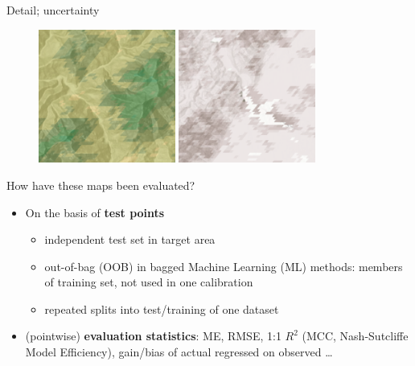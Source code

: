 \documentclass[aspectratio=169]{beamer}
\begin{document}
\begin{frame}{Detail; uncertainty}
\begin{figure}
\includegraphics[width=0.4\textwidth]{./graphics_david/SoilGridsDetail.png}
\hfill
\includegraphics[width=0.4\textwidth]{./graphics_david/SoilGridsUncertainty.png}
\end{figure}
\end{frame}

\begin{frame}{How have these maps been evaluated?}
    \begin{itemize}
        \item On the basis of \textbf{test points}
        \begin{itemize}
            \item independent test set in target area
            \item out-of-bag (OOB) in bagged Machine Learning (ML) methods: members of training set, not used in one calibration
            \item repeated splits into test/training of one dataset
        \end{itemize}
        \item (pointwise) \textbf{evaluation statistics}: ME, RMSE, 1:1 $R^2$ (MCC, Nash-Sutcliffe Model Efficiency), gain/bias of actual regressed on observed \ldots
    \end{itemize}
\end{frame}
\end{document}
